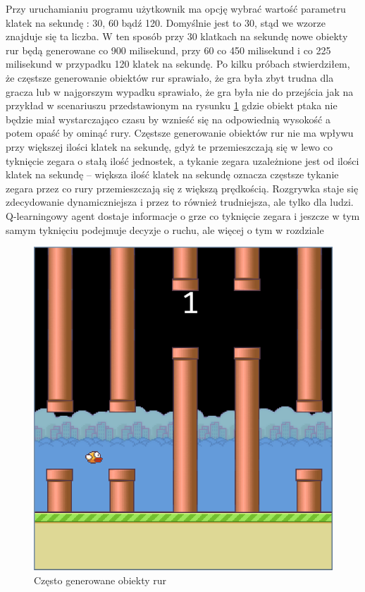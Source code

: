 \documentclass[a4paper, 12pt,oneside]{book}
\begin{document}
Przy uruchamianiu programu użytkownik ma opcję wybrać wartość parametru 
klatek na sekundę : 30, 60 bądź 120. Domyślnie jest to 30, stąd we wzorze
znajduje się ta liczba. W ten sposób przy 30 klatkach na sekundę nowe obiekty
rur będą generowane co 900 milisekund, przy 60 co 450 milisekund i co 225
milisekund w przypadku 120 klatek na sekundę. Po kilku próbach stwierdziłem,
że częstsze generowanie obiektów rur sprawiało, że gra była zbyt trudna dla
gracza lub w najgorszym wypadku sprawiało, że gra była nie do przejścia
jak na przykład w scenariuszu przedstawionym na rysunku \ref{frequent_pipes}
gdzie obiekt ptaka nie będzie miał wystarczająco czasu by wznieść się na 
odpowiednią wysokość a potem opaść by ominąć rury. Częstsze generowanie 
obiektów rur nie ma wpływu przy większej ilości klatek na sekundę, gdyż te
przemieszczają się w lewo co tyknięcie zegara o stałą ilość jednostek, a
tykanie zegara uzależnione jest od ilości klatek na sekundę -- większa ilość
klatek na sekundę oznacza częstsze tykanie zegara przez co rury przemieszczają
się z większą prędkością. Rozgrywka staje się zdecydowanie dynamiczniejsza
i przez to również trudniejsza, ale tylko dla ludzi. Q-learningowy agent
dostaje informacje o grze co tyknięcie zegara i jeszcze w tym samym tyknięciu
podejmuje decyzje o ruchu, ale więcej o tym w rozdziale
\begin{figure}
	\begin{center}
		\includegraphics[scale=0.50]{impossible_pipes.png}
		\caption{Często generowane obiekty rur}
		\label{frequent_pipes}
	\end{center}
\end{figure}
\end{document}
